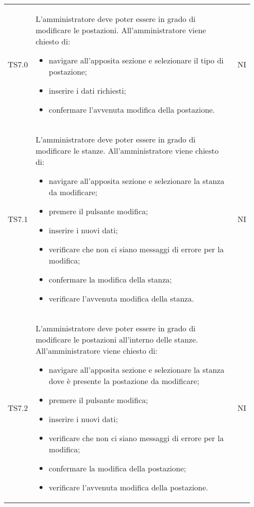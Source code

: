 {\begin{longtable}{ c C{11cm} c }
        TS7.0&
        L'amministratore deve poter essere in grado di modificare le postazioni.\newline
        All'amministratore viene chiesto di:
        \begin{itemize}
            \item navigare all'apposita sezione e selezionare il tipo di postazione;
            \item inserire i dati richiesti;
            \item confermare l'avvenuta modifica della postazione.
        \end{itemize}&
        NI\\

        TS7.1&
        L'amministratore deve poter essere in grado di modificare le stanze.\newline
        All'amministratore viene chiesto di:
        \begin{itemize}
            \item navigare all'apposita sezione e selezionare la stanza da modificare;
            \item premere il pulsante modifica;
            \item inserire i nuovi dati;
            \item verificare che non ci siano messaggi di errore per la modifica;
            \item confermare la modifica della stanza;
            \item verificare l'avvenuta modifica della stanza.
        \end{itemize}&
        NI\\

        TS7.2&
        L'amministratore deve poter essere in grado di modificare le postazioni all'interno delle stanze.\newline
        All'amministratore viene chiesto di:
        \begin{itemize}
            \item navigare all'apposita sezione e selezionare la stanza dove è presente la postazione da modificare;
            \item premere il pulsante modifica;
            \item inserire i nuovi dati;
            \item verificare che non ci siano messaggi di errore per la modifica;
            \item confermare la modifica della postazione;
            \item verificare l'avvenuta modifica della postazione.
        \end{itemize}&
        NI\\


\end{longtable}}
